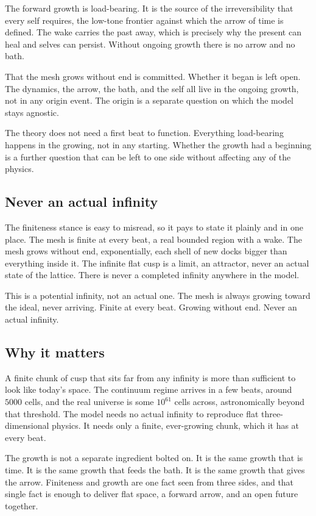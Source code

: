The forward growth is load-bearing. It is the source of the irreversibility that every self requires, the low-tone frontier against which the arrow of time is defined. The wake carries the past away, which is precisely why the present can heal and selves can persist. Without ongoing growth there is no arrow and no bath.

\begin{result}
That the mesh grows without end is committed. Whether it began is left open. The dynamics, the arrow, the bath, and the self all live in the ongoing growth, not in any origin event. The origin is a separate question on which the model stays agnostic.
\end{result}

The theory does not need a first beat to function. Everything load-bearing happens in the growing, not in any starting. Whether the growth had a beginning is a further question that can be left to one side without affecting any of the physics.

\subsection{Never an actual infinity}

The finiteness stance is easy to misread, so it pays to state it plainly and in one place. The mesh is finite at every beat, a real bounded region with a wake. The mesh grows without end, exponentially, each shell of new docks bigger than everything inside it. The infinite flat cusp is a limit, an attractor, never an actual state of the lattice. There is never a completed infinity anywhere in the model.

\begin{principle}
This is a potential infinity, not an actual one. The mesh is always growing toward the ideal, never arriving. Finite at every beat. Growing without end. Never an actual infinity.
\end{principle}

\subsection{Why it matters}

A finite chunk of cusp that sits far from any infinity is more than sufficient to look like today's space. The continuum regime arrives in a few beats, around $5000$ cells, and the real universe is some $10^{61}$ cells across, astronomically beyond that threshold. The model needs no actual infinity to reproduce flat three-dimensional physics. It needs only a finite, ever-growing chunk, which it has at every beat.

The growth is not a separate ingredient bolted on. It is the same growth that is time. It is the same growth that feeds the bath. It is the same growth that gives the arrow. Finiteness and growth are one fact seen from three sides, and that single fact is enough to deliver flat space, a forward arrow, and an open future together.
